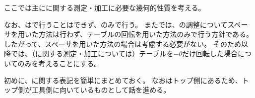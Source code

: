

ここでは主に\textbf{\Dimple}に関する測定・加工に必要な幾何的性質を考える。

なお、\DimpleMilling は\MMC で行うことはできず、\DMC のみで行う。
また\DMC では、\AlocationLength の調整についてスペーサを用いた方法は行わず、テーブルの回転を用いた方法のみで行う方針である。
したがって、スペーサを用いた方法の場合は考慮する必要がない。
そのため以降では、（\Dimple に関する測定・加工については）テーブルを$-\theta$だけ回転した場合についてのみを考えることにする。



初めに、\nameDimple に関する表記を簡単にまとめておく。
なお\Dimple はトップ側にあるため、トップ側が工具側に向いているものとして話を進める。


